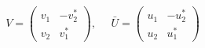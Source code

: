 \begin{equation}
V=\left(
\begin{array}{cc}
v_{1} & -v_{2}^{\ast}\\
v_{2} & v_{1}^{\ast}
\end{array}
\right),~~~~~~\bar{U} =  \left(
\begin{array}{cc}
u_{1} & -u_{2}^{\ast}\\
u_{2} & u_{1}^{\ast}
\end{array}
\right)    
\end{equation}

